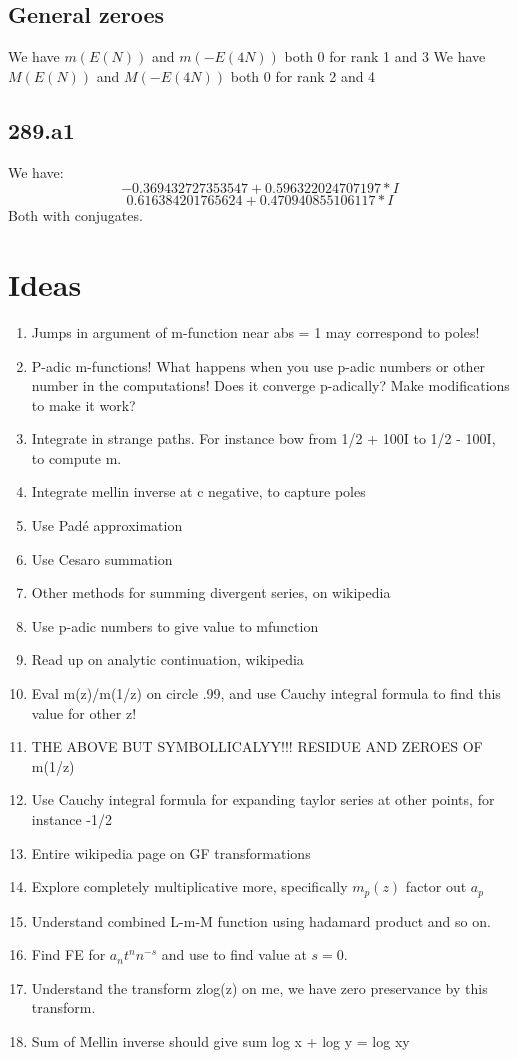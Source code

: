 \documentclass[a4paper]{amsart}
\begin{document}
\subsection{General zeroes}

We have $m(E(N))$ and $m(-E(4N))$ both $0$ for rank 1 and 3
We have $M(E(N))$ and $M(-E(4N))$ both $0$ for rank 2 and 4

\subsection{289.a1}

We have:
$$-0.369432727353547 + 0.596322024707197*I$$
$$0.616384201765624 + 0.470940855106117*I$$
Both with conjugates.

\section{Ideas}

\begin{enumerate}
  \item Jumps in argument of m-function near abs = 1 may correspond to poles!
  \item P-adic m-functions! What happens when you use p-adic numbers or other number in the computations! Does it converge p-adically? Make modifications to make it work?
  \item Integrate in strange paths. For instance bow from 1/2 + 100I to 1/2 - 100I, to compute m.
  \item Integrate mellin inverse at c negative, to capture poles
  \item Use Padé approximation
  \item Use Cesaro summation
  \item Other methods for summing divergent series, on wikipedia
  \item Use p-adic numbers to give value to mfunction
  \item Read up on analytic continuation, wikipedia
  \item Eval m(z)/m(1/z) on circle .99, and use Cauchy integral formula to find this value for other z!
  \item THE ABOVE BUT SYMBOLLICALYY!!! RESIDUE AND ZEROES OF m(1/z)
  \item Use Cauchy integral formula for expanding taylor series at other points, for instance -1/2
  \item Entire wikipedia page on GF transformations
  \item Explore completely multiplicative more, specifically $m_p(z)$ factor out $a_p$
  \item Understand combined L-m-M function using hadamard product and so on.
  \item Find FE for $a_nt^nn^{-s}$ and use to find value at $s = 0$.
  \item Understand the transform zlog(z) on me, we have zero preservance by this transform.
  \item Sum of Mellin inverse should give sum log x + log y = log xy
\end{enumerate}
\end{document}
